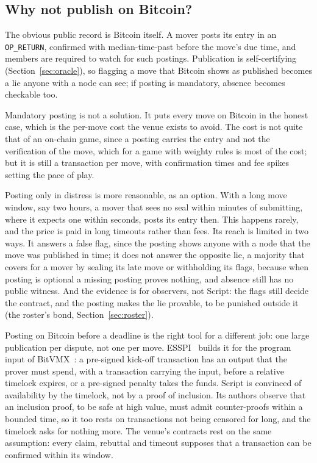 \documentclass[11pt]{article}
\begin{document}
\subsection{Why not publish on Bitcoin?}

The obvious public record is Bitcoin itself. A mover posts its entry in
an \texttt{OP\_RETURN}, confirmed with median-time-past before the
move's due time, and members are required to watch for such postings.
Publication is self-certifying (Section~\ref{sec:oracle}), so flagging a
move that Bitcoin shows as published becomes a lie anyone with a node
can see; if posting is mandatory, absence becomes checkable too.

Mandatory posting is not a solution. It puts every move on Bitcoin in
the honest case, which is the per-move cost the venue exists to avoid.
The cost is not quite that of an on-chain game, since a posting carries
the entry and not the verification of the move, which for a game with
weighty rules is most of the cost; but it is still a transaction per
move, with confirmation times and fee spikes setting the pace of play.

Posting only in distress is more reasonable, as an option. With a long
move window, say two hours, a mover that sees no seal within minutes of
submitting, where it expects one within seconds, posts its entry then.
This happens rarely, and the price is paid in long timeouts rather than
fees. Its reach is limited in two ways. It answers a false flag, since
the posting shows anyone with a node that the move was published in
time; it does not answer the opposite lie, a majority that covers for a
mover by sealing its late move or withholding its flags, because when
posting is optional a missing posting proves nothing, and absence still
has no public witness. And the evidence is for observers, not Script:
the flags still decide the contract, and the posting makes the lie
provable, to be punished outside it (the roster's bond,
Section~\ref{sec:roster}).

Posting on Bitcoin before a deadline is the right tool for a different
job: one large publication per dispute, not one per move.
ESSPI~\cite{esspi} builds it for the program input of
BitVMX~\cite{bitvmx}: a pre-signed kick-off transaction has an output
that the prover must spend, with a transaction carrying the input,
before a relative timelock expires, or a pre-signed penalty takes the
funds. Script is convinced of availability by the timelock, not by a
proof of inclusion. Its authors observe that an inclusion proof, to be
safe at high value, must admit counter-proofs within a bounded time, so
it too rests on transactions not being censored for long, and the
timelock asks for nothing more. The venue's contracts rest on the same
assumption: every claim, rebuttal and timeout supposes that a
transaction can be confirmed within its window.
\end{document}
